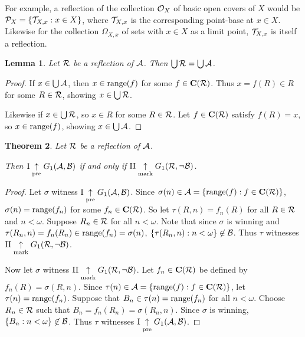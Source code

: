 \documentclass{amsart}
\theoremstyle{plain}
\newtheorem{theorem}{Theorem}
\newtheorem{lemma}[theorem]{Lemma}
\theoremstyle{definition}
\theoremstyle{remark}
\theoremstyle{plain}
\theoremstyle{definition}
\theoremstyle{remark}
\begin{document}
  For example, a reflection of the collection \(\mathcal{O}_X\) of basic open covers
  of \(X\) would be \(\mathcal{P}_X=\{\mathcal{T}_{X,x}:x\in X\}\), where \(\mathcal{T}_{X,x}\) 
  is the corresponding point-base at \(x\in X\). 
  Likewise for the collection \(\Omega_{X,x}\)
  of sets with \(x\in X\) as a limit point, \(\mathcal{T}_{X,x}\) is itself
  a reflection.

\begin{lemma}
  Let \(\mathcal{R}\) be a reflection of \(\mathcal{A}\). Then \(\bigcup \mathcal{R}=\bigcup \mathcal{A}\).
\end{lemma}
\begin{proof}
  If \(x\in \bigcup\mathcal{A}\), then \(x\in\text{range}(f)\) for some \(f\in\mathbf C(\mathcal{R})\).
  Thus \(x=f(R)\in R\) for some \(R\in\mathcal{R}\), showing \(x\in\bigcup\mathcal{R}\).

  Likewise if \(x\in\bigcup\mathcal{R}\), so \(x\in R\) for some \(R\in \mathcal{R}\).
  Let \(f\in\mathbf C(\mathcal{R})\) satisfy \(f(R)=x\), so \(x\in\text{range}(f)\),
  showing \(x\in\bigcup\mathcal{A}\).
\end{proof}

\begin{theorem}
  Let \(\mathcal{R}\) be a reflection of \(\mathcal{A}\). 

  Then
  \(\mathrm{I}\underset{\text{pre}}{\uparrow}G_{1}(\mathcal{A},\mathcal{B})\) if and only if
  \(\mathrm{II}\underset{\text{mark}}{\uparrow}G_{1}(\mathcal{R},\neg\mathcal{B})\).
\end{theorem}

\begin{proof}
  Let \(\sigma\) witness 
  \(\mathrm{I}\underset{\text{pre}}{\uparrow}G_{1}(\mathcal{A},\mathcal{B})\).
  Since \(\sigma(n)\in\mathcal{A}=\{\text{range}(f):f\in\mathbf C(\mathcal{R})\}\), 
  \(\sigma(n)=\text{range}(f_n)\)
  for some \(f_n\in\mathbf C(\mathcal{R})\). So let
  \(\tau(R,n)=f_n(R)\) for all \(R\in \mathcal{R}\) and \(n<\omega\).
  Suppose \(R_n\in \mathcal{R}\) for all \(n<\omega\).
  Note that since \(\sigma\) is winning and 
  \(\tau(R_n,n)=f_n(R_n)\in\text{range}(f_n)=\sigma(n)\),
  \(\{\tau(R_n,n):n<\omega\}\not\in\mathcal{B}\). Thus \(\tau\) witnesses
  \(\mathrm{II}\underset{\text{mark}}{\uparrow}G_{1}(\mathcal{R},\neg\mathcal{B})\).

  Now let \(\sigma\) witness
  \(\mathrm{II}\underset{\text{mark}}{\uparrow}G_{1}(\mathcal{R},\neg\mathcal{B})\).
  Let \(f_n\in\mathbf C(\mathcal{R})\) be defined by \(f_n(R)=\sigma(R,n)\).
  Since \(\tau(n)\in\mathcal{A}=\{\text{range}(f):f\in\mathbf C(\mathcal{R})\}\), let
  \(\tau(n)=\text{range}(f_n)\). Suppose that \(B_n\in\tau(n)=\text{range}(f_n)\) for
  all \(n<\omega\). Choose \(R_n\in\mathcal{R}\) such that 
  \(B_n=f_n(R_n)=\sigma(R_n,n)\). Since \(\sigma\) is winning,
  \(\{B_n:n<\omega\}\not\in\mathcal{B}\). Thus \(\tau\) witnesses
  \(\mathrm{I}\underset{\text{pre}}{\uparrow}G_{1}(\mathcal{A},\mathcal{B})\).
\end{proof}
\end{document}
